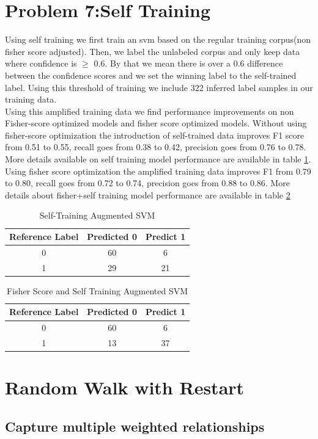 \documentclass[11pt]{article}
\begin{document}
\section{Problem 7:Self Training}
Using self training we first train an svm based on the regular training corpus(non fisher score adjusted). Then, we label the unlabeled corpus and only keep data where confidence is $\ge$ 0.6. By that we mean there is over a 0.6 difference between the confidence scores and we set the winning label to the self-trained label. Using this threshold of training we include 322 inferred label samples in our training data. \\
Using this amplified training data we find performance improvements on non Fisher-score optimized models and fisher score optimized models. Without using fisher-score optimization the introduction of self-trained data improves F1 score from 0.51 to 0.55, recall goes from 0.38 to 0.42, precision goes from 0.76 to 0.78. More details available on self training model performance are available in table \ref{tab:Accuracy3}. Using fisher score optimization the amplified training data improves F1 from 0.79 to 0.80, recall goes from 0.72 to 0.74, precision goes from 0.88 to 0.86. More details about fisher+self training model performance are available in table \ref{tab:Accuracy4}
\begin{table}[]
    \centering
    \begin{tabular}{|c|c|c|} \hline
       Reference Label  & Predicted 0 & Predict 1   \\ \hline
       0 & 60 & 6 \\ \hline
       1 & 29 & 21 \\ \hline
    \end{tabular}
    \caption{Self-Training Augmented SVM}
    \label{tab:Accuracy3}
\end{table}
\begin{table}[]
    \centering
    \begin{tabular}{|c|c|c|} \hline
       Reference Label  & Predicted 0 & Predict 1   \\ \hline
       0 & 60 & 6 \\ \hline
       1 & 13 & 37 \\ \hline
    \end{tabular}
    \caption{Fisher Score and Self Training Augmented SVM}
    \label{tab:Accuracy4}
\end{table}
\section{Random Walk with Restart}
\subsection{Capture multiple weighted relationships}
\end{document}
